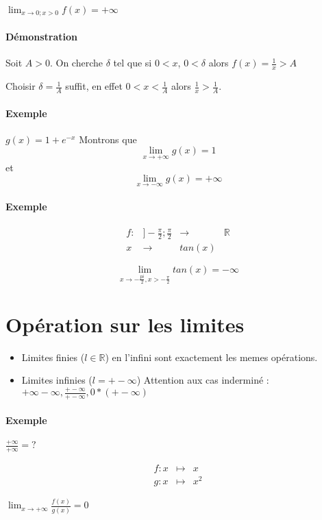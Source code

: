 $\lim_{x \to 0; x > 0} f(x) = +\infty$
\paragraph{Démonstration} Soit $A>0$. On cherche $\delta$ tel que si $0<x$, $0<\delta$ alors $f(x) = \frac{1}{x} > A$

Choisir $\delta = \frac{1}{A}$ suffit, en effet $0<x<\frac{1}{A}$ alors $\frac{1}{x} > \frac{1}{A}$.

\paragraph{Exemple}
$g(x) = 1+e^{-x}$ Montrons que \[\lim_{x \to +\infty} g(x) = 1\] et \[\lim_{x \to -\infty}g(x) = +\infty\]

\paragraph{Exemple}
\begin{align*}
f:& ]-\frac{\pi}{2}; \frac{\pi}{2} &\rightarrow & \mathbb{R} \\
	x&\rightarrow& tan(x)
\end{align*}

\[\lim_{x \to -\frac{pi}{2}, x > - \frac{\pi}{2}} tan(x) = -\infty\]

\section{Opération sur les limites}
\begin{itemize}
	\item[] Limites finies ($l\in \mathbb{R}$) en l'infini sont exactement les memes opérations.
	\item[] Limites infinies ($l = +- \infty$) Attention aux cas inderminé :
		$+\infty - \infty, \frac{+- \infty}{+-\infty}, 0*(+-\infty)$
\end{itemize}

\paragraph{Exemple} $\frac{+\infty}{+\infty} = ?$

\begin{align*}
	f:x & \mapsto & x \\
	g:x &\mapsto & x^2
\end{align*}

$\lim_{x \to +\infty} \frac{f(x)}{g(x)} = 0$

